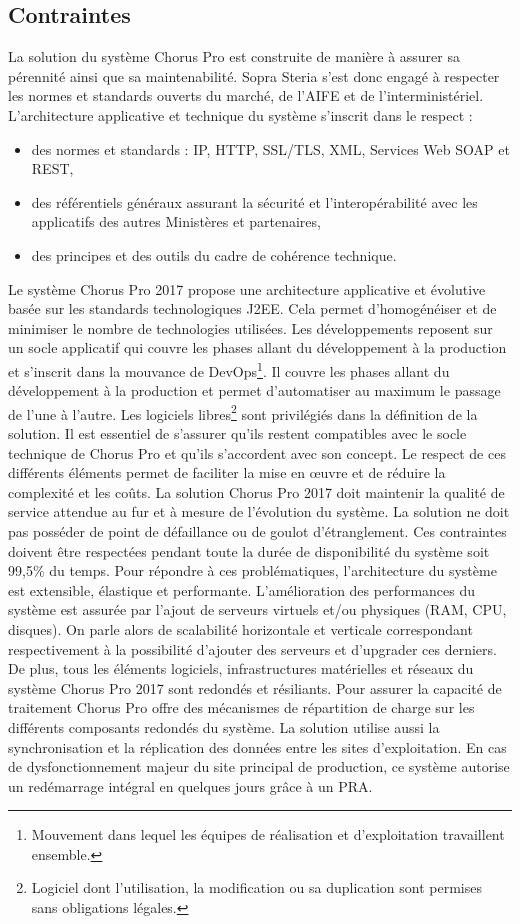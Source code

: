 \documentclass[12pt,a4paper]{article}
\begin{document}
\subsection{Contraintes}
La solution du système Chorus Pro est construite de manière à assurer sa pérennité ainsi que sa maintenabilité. Sopra Steria s'est donc engagé à respecter les normes et standards ouverts du marché, de l'AIFE et de l'interministériel. L’architecture applicative et technique du système s’inscrit dans le respect :
\smallbreak
\begin{itemize}
\item	des normes et standards : IP, HTTP, SSL/TLS, XML, Services Web \gls{SOAP} et \gls{REST},
\item	des référentiels généraux assurant la sécurité et l’interopérabilité avec les applicatifs des autres Ministères et partenaires,
\item	des principes et des outils du cadre de cohérence technique.
\end{itemize}
\medbreak
Le système Chorus Pro 2017 propose une architecture applicative et évolutive basée sur les standards technologiques \gls{J2EE}. Cela permet d'homogénéiser et de minimiser le nombre de technologies utilisées. Les développements reposent sur un socle applicatif qui couvre les phases allant du développement à la production et s’inscrit dans la mouvance de DevOps\footnote{Mouvement dans lequel les équipes de réalisation et d'exploitation travaillent ensemble.}. Il couvre les
phases allant du développement à la production et permet d’automatiser au maximum le passage de l'une à l'autre. Les logiciels libres\footnote{Logiciel dont l'utilisation, la modification ou sa duplication sont permises sans obligations légales.} sont privilégiés dans la définition de la solution. Il est essentiel de s'assurer qu’ils restent compatibles avec le socle technique de Chorus Pro et qu'ils s'accordent avec son concept. Le respect de ces différents éléments permet de faciliter la mise en œuvre et de réduire la complexité et les coûts.
\smallbreak
La solution Chorus Pro 2017 doit maintenir la qualité de service attendue au fur et à mesure de l’évolution du système. La solution ne doit pas posséder de point de défaillance ou de goulot d'étranglement. Ces contraintes doivent être respectées pendant toute la durée de disponibilité du système soit 99,5\% du temps.
\smallbreak
Pour répondre à ces problématiques, l'architecture du système est extensible, élastique et performante. L'amélioration des performances du système est assurée par l'ajout de serveurs virtuels et/ou physiques (\gls{RAM}, \gls{CPU}, disques). On parle alors de scalabilité horizontale et verticale correspondant respectivement à la possibilité d'ajouter des serveurs et d'upgrader ces derniers.
\smallbreak
De plus, tous les éléments logiciels, infrastructures matérielles et réseaux du système Chorus Pro 2017 sont redondés et résiliants. Pour assurer la capacité de traitement Chorus Pro offre des mécanismes de répartition de charge sur les différents composants redondés du système. La solution utilise aussi la synchronisation et la réplication des données entre les sites d’exploitation. En cas de dysfonctionnement majeur du site principal de production, ce système autorise un redémarrage intégral en quelques jours grâce à un \gls{PRA}.  
\end{document}
